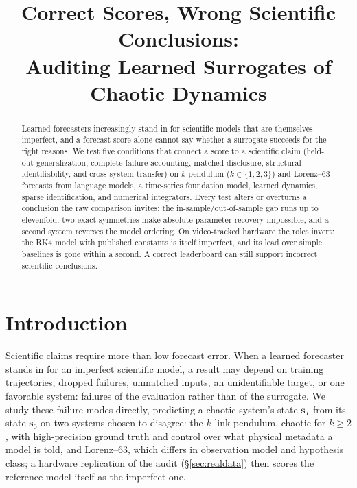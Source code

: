 \documentclass{article}
\title{Correct Scores, Wrong Scientific Conclusions:\\
Auditing Learned Surrogates of Chaotic Dynamics}
\author{}
\begin{document}
\maketitle

\begin{abstract}
Learned forecasters increasingly stand in for scientific models that are themselves imperfect,
and a forecast score alone cannot say whether a surrogate succeeds for the right reasons. We
test five conditions that connect a score to a scientific claim (held-out generalization,
complete failure accounting, matched disclosure, structural identifiability, and cross-system
transfer) on $k$-pendulum ($k\in\{1,2,3\}$) and Lorenz--63 forecasts from
language models, a time-series foundation model, learned dynamics, sparse identification, and
numerical integrators. Every test alters or overturns a conclusion the raw comparison invites: the
in-sample/out-of-sample gap runs up to elevenfold, two exact symmetries make absolute parameter
recovery impossible, and a second system reverses the model ordering. On video-tracked
hardware the roles invert: the RK4 model with published constants is itself imperfect, and
its lead over simple baselines is gone within a second. A correct leaderboard can still
support incorrect scientific conclusions.
\end{abstract}

\section{Introduction}
Scientific claims require more than low forecast error. When a learned forecaster stands in
for an imperfect scientific model, a result may depend on training trajectories, dropped
failures, unmatched inputs, an unidentifiable target, or one favorable system: failures of the
evaluation rather than of the surrogate. We study these failure modes directly,
predicting a chaotic system's state $\mathbf{s}_T$ from its state $\mathbf{s}_0$ on two
systems chosen to disagree: the $k$-link pendulum, chaotic for $k{\ge}2$, with high-precision
ground truth and control over what physical metadata a model is told, and Lorenz--63, which
differs in observation model and hypothesis class; a hardware replication of the audit
(\S\ref{sec:realdata}) then scores the reference model itself as the imperfect one.
\end{document}
